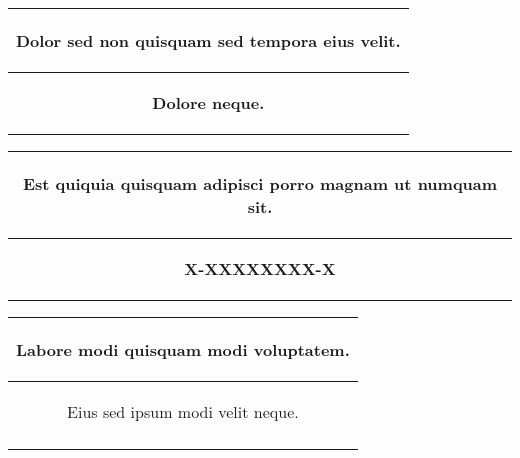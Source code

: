 \documentclass[a4paper,landscape]{article}%
\begin{document}
\linebreak%
\begin{tabular}{|m{100cm}|}%
\hline%
\multicolumn{1}{|c|}{\begin{footnotesize}%
Dolor sed non quisquam sed tempora eius velit.%
\end{footnotesize}}\\%
\hline%
\multicolumn{1}{|c|}{\begin{small}%
\textbf{Dolore neque.}%
\end{small}}\\%
\hline%
\end{tabular}%
\hspace*{227pt}%
\begin{tabular}{|m{100cm}|}%
\hline%
\multicolumn{1}{|c|}{\begin{footnotesize}%
Est quiquia quisquam adipisci porro magnam ut numquam sit.%
\end{footnotesize}}\\%
\hline%
\multicolumn{1}{|c|}{\begin{small}%
\textbf{X{-}XXXXXXXX{-}X}%
\end{small}}\\%
\hline%
\end{tabular}%
\linebreak%
\linebreak%
\linebreak%
\begin{tabular}{m{27.71cm}}%
\hline%
\multicolumn{1}{|c|}{\begin{footnotesize}%
Labore modi quisquam modi voluptatem.%
\end{footnotesize}}\\%
\hline%
\multicolumn{1}{|c|}{\begin{small}%
Eius sed ipsum modi velit neque.%
\end{small}}\\%
\hline%
\\%
\end{tabular}%
\end{document}
